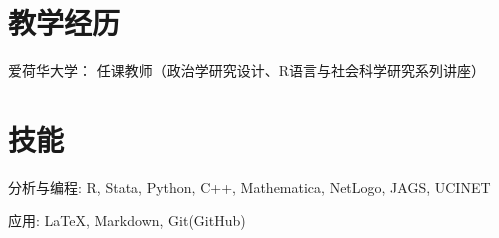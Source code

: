 \documentclass[10.5pt,]{article}
\providecommand{\tightlist}{%
	\setlength{\itemsep}{0pt}\setlength{\parskip}{0pt}}
\renewenvironment{itemize}{
	\begin{list}{}{
			\setlength{\leftmargin}{1.5em}
		}
	}{
	\end{list}
}
\begin{document}
\section{教学经历}

\begin{itemize}
\tightlist
\item
  爱荷华大学： 任课教师（政治学研究设计、R语言与社会科学研究系列讲座）
\end{itemize}

\section{技能}

\begin{itemize}
\tightlist
\item
  分析与编程: R, Stata, Python, C++, Mathematica, NetLogo, JAGS, UCINET
\item
  应用: \LaTeX, Markdown, Git(GitHub)
\end{itemize}
	
			
\end{document}
